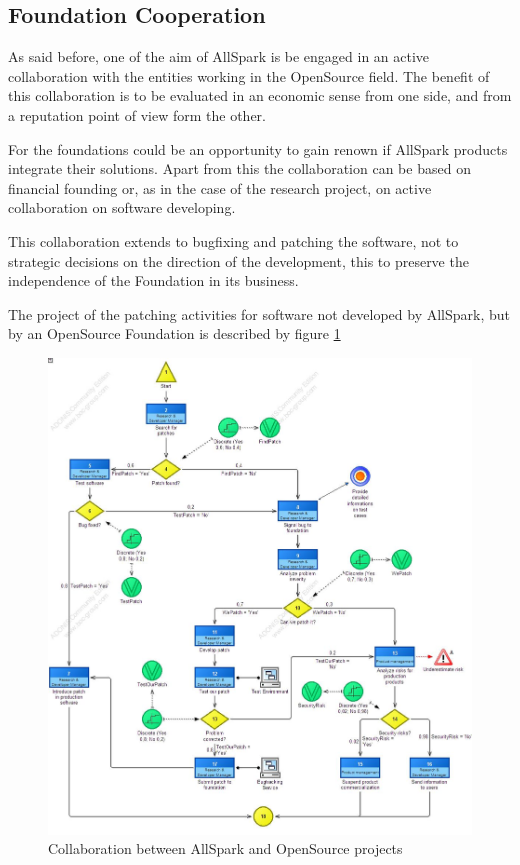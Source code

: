 \subsection{Foundation Cooperation}
As said before, one of the aim of AllSpark is be engaged in an active
collaboration with the entities working in the OpenSource field. The
benefit of this collaboration is to be evaluated in an economic sense from
one side, and from a reputation point of view form the other.

For the foundations could be an opportunity to gain renown if AllSpark
products integrate their solutions. Apart from this the collaboration can
be based on financial founding or, as in the case of the research project,
on active collaboration on software developing.

This collaboration extends to bugfixing and patching the software, not to
strategic decisions on the direction of the development, this to preserve
the independence of the Foundation in its business.

The project of the patching activities for software not developed by
AllSpark, but by an OpenSource Foundation is described by figure
\ref{2img:found_coop}

\begin{figure}[!ht]
\begin{centering}
\includegraphics[scale=0.40]{assign2/adonis/imgs/coop.jpg}
\caption{Collaboration between AllSpark and OpenSource projects}
\label{2img:found_coop}
\end{centering}
\end{figure}

